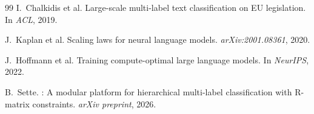 \documentclass[11pt,a4paper]{article}
\begin{document}
\begin{thebibliography}{99}
I.~Chalkidis et al.
\newblock Large-scale multi-label text classification on EU legislation.
\newblock In \emph{ACL}, 2019.

J.~Kaplan et al.
\newblock Scaling laws for neural language models.
\newblock \emph{arXiv:2001.08361}, 2020.

J.~Hoffmann et al.
\newblock Training compute-optimal large language models.
\newblock In \emph{NeurIPS}, 2022.

B.~Sette.
: A modular platform for hierarchical multi-label
classification with {R}-matrix constraints.
\newblock \emph{arXiv preprint}, 2026.

\end{thebibliography}
\end{document}
